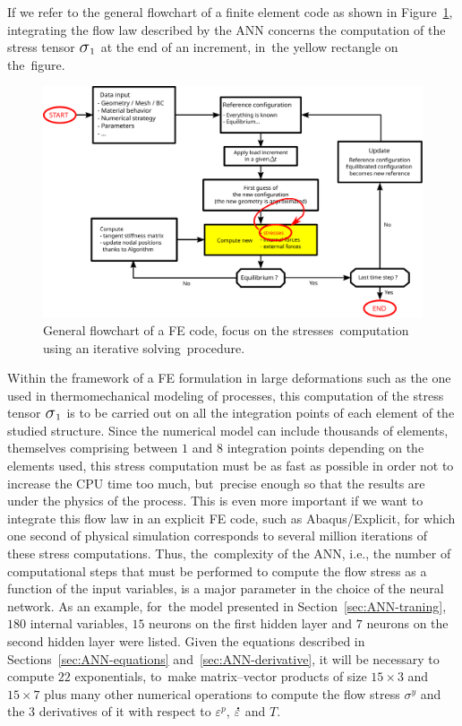 \documentclass[algorithms,article,accept,pdftex,oneauthors]{Definitions/mdpi}
\makeatletter
\DeclareRobustCommand{\Sig}{\mbox{\Large\ensuremath{\sigma}}}
\DeclareRobustCommand{\mdot}[1]{\accentset{\mbox{\bfseries .}}{#1}}
\DeclareRobustCommand{\ie}{{i.e.,}\@\xspace}
\makeatother
\begin{document}
If we refer to the general flowchart of a finite element code as shown in Figure~\ref{fig:StressUpdate}, integrating the flow law described by the ANN concerns the computation of the stress tensor $\Sig_1$ {at the end of} %
 an increment, in~the yellow rectangle on the~figure.
\begin{figure}[H]
\includegraphics[width=0.9\columnwidth]{Figures/StressUpdate}
\caption{{General flowchart} %
 of a FE code, focus on the stresses~computation using an iterative solving~procedure.}
\label{fig:StressUpdate}
\end{figure}
Within the framework of a FE formulation in large deformations such as the one used in thermomechanical modeling of processes, this computation of the stress tensor $\Sig_1$ is to be carried out on all the integration points of each element of the studied structure.
Since the numerical model can include thousands of elements, themselves comprising between $1$ and $8$ integration points depending on the elements used, this stress computation must be as fast as possible in order not to increase the CPU time too much, but~precise enough so that the results are under the physics of the process.
This is even more important if we want to integrate this flow law in an explicit FE code, such as Abaqus/Explicit, for which one second of physical simulation corresponds to several million iterations of these stress computations.
Thus, the~complexity of the ANN, \ie the number of computational steps that must be performed to compute the flow stress as a function of the input variables, is a major parameter in the choice of the neural network.
As an example, for~the model presented in Section~\ref{sec:ANN-traning}, $180$ internal variables, $15$ neurons on the first hidden layer and $7$ neurons on the second hidden layer were listed.
Given the equations described in Sections~\ref{sec:ANN-equations} and~\ref{sec:ANN-derivative}, it will be necessary to compute $22$ exponentials, to~make matrix--vector products of size $15\times3$ and $15\times7$ plus many other numerical operations to compute the flow stress $\sigma^y$ and the $3$ derivatives of it with respect to $\varepsilon^p$, $\mdot\varepsilon$ and $T$.
\end{document}
